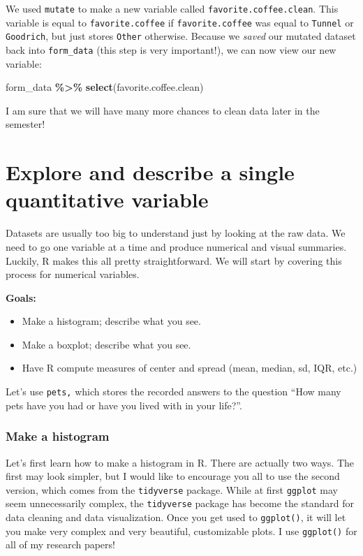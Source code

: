 \documentclass[
]{article}
\newenvironment{Shaded}{\begin{snugshade}}{\end{snugshade}}
\newcommand{\FunctionTok}[1]{\textcolor[rgb]{0.13,0.29,0.53}{\textbf{#1}}}
\newcommand{\NormalTok}[1]{#1}
\newcommand{\SpecialCharTok}[1]{\textcolor[rgb]{0.81,0.36,0.00}{\textbf{#1}}}
\providecommand{\tightlist}{%
  \setlength{\itemsep}{0pt}\setlength{\parskip}{0pt}}
\begin{document}
We used \texttt{mutate} to make a new variable called
\texttt{favorite.coffee.clean}. This variable is equal to
\texttt{favorite.coffee} if \texttt{favorite.coffee} was equal to
\texttt{Tunnel} or \texttt{Goodrich}, but just stores \texttt{Other}
otherwise. Because we \emph{saved} our mutated dataset back into
\texttt{form\_data} (this step is very important!), we can now view our
new variable:

\begin{Shaded}
\begin{Highlighting}[]
\NormalTok{form\_data }\SpecialCharTok{\%\textgreater{}\%} \FunctionTok{select}\NormalTok{(favorite.coffee.clean)}
\end{Highlighting}
\end{Shaded}

I am sure that we will have many more chances to clean data later in the
semester!

\section{Explore and describe a single quantitative
variable}\label{explore-and-describe-a-single-quantitative-variable}

Datasets are usually too big to understand just by looking at the raw
data. We need to go one variable at a time and produce numerical and
visual summaries. Luckily, R makes this all pretty straightforward. We
will start by covering this process for numerical variables.

\label{boxedtext}
\textbf{Goals:}

\begin{itemize}
\tightlist
\item
  Make a histogram; describe what you see.
\item
  Make a boxplot; describe what you see.
\item
  Have R compute measures of center and spread (mean, median, sd, IQR,
  etc.)
\end{itemize}

Let's use \texttt{pets,} which stores the recorded answers to the
question ``How many pets have you had or have you lived with in your
life?''.

\subsubsection{Make a histogram}\label{make-a-histogram}

Let's first learn how to make a histogram in R. There are actually two
ways. The first may look simpler, but I would like to encourage you all
to use the second version, which comes from the \texttt{tidyverse}
package. While at first \texttt{ggplot} may seem unnecessarily complex,
the \texttt{tidyverse} package has become the standard for data cleaning
and data visualization. Once you get used to \texttt{ggplot()}, it will
let you make very complex and very beautiful, customizable plots. I use
\texttt{ggplot()} for all of my research papers!
\end{document}
